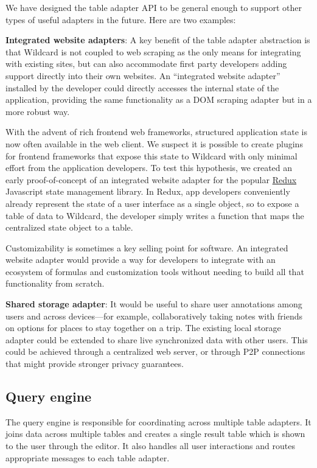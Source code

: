 \documentclass[sigplan,screen,10pt,anonymous,review]{acmart}
\begin{document}
We have designed the table adapter API to be general enough to support
other types of useful adapters in the future. Here are two examples:

\textbf{Integrated website adapters}: A key benefit of the table adapter
abstraction is that Wildcard is not coupled to web scraping as the only
means for integrating with existing sites, but can also accommodate
first party developers adding support directly into their own websites.
An ``integrated website adapter'' installed by the developer could
directly accesses the internal state of the application, providing the
same functionality as a DOM scraping adapter but in a more robust way.

With the advent of rich frontend web frameworks, structured application
state is now often available in the web client. We suspect it is
possible to create plugins for frontend frameworks that expose this
state to Wildcard with only minimal effort from the application
developers. To test this hypothesis, we created an early
proof-of-concept of an integrated website adapter for the popular
\href{https://redux.js.org/}{Redux} Javascript state management library.
In Redux, app developers conveniently already represent the state of a
user interface as a single object, so to expose a table of data to
Wildcard, the developer simply writes a function that maps the
centralized state object to a table.

Customizability is sometimes a key selling point for software. An
integrated website adapter would provide a way for developers to
integrate with an ecosystem of formulas and customization tools without
needing to build all that functionality from scratch.

\textbf{Shared storage adapter}: It would be useful to share user
annotations among users and across devices---for example,
collaboratively taking notes with friends on options for places to stay
together on a trip. The existing local storage adapter could be extended
to share live synchronized data with other users. This could be achieved
through a centralized web server, or through P2P connections that might
provide stronger privacy guarantees.

\hypertarget{query-engine}{%
\subsection{Query engine}\label{query-engine}}

The query engine is responsible for coordinating across multiple table
adapters. It joins data across multiple tables and creates a single
result table which is shown to the user through the editor. It also
handles all user interactions and routes appropriate messages to each
table adapter.
\end{document}
